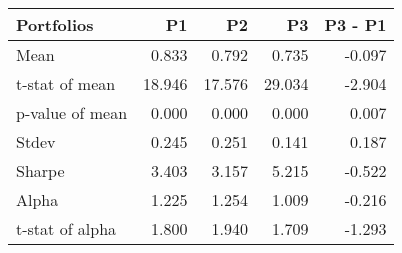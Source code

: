 \begin{tabular}{lrrrr}
\toprule
Portfolios & P1 & P2 & P3 & P3 - P1 \\
\midrule
Mean & 0.833 & 0.792 & 0.735 & -0.097 \\
t-stat of mean & 18.946 & 17.576 & 29.034 & -2.904 \\
p-value of mean & 0.000 & 0.000 & 0.000 & 0.007 \\
Stdev & 0.245 & 0.251 & 0.141 & 0.187 \\
Sharpe & 3.403 & 3.157 & 5.215 & -0.522 \\
Alpha & 1.225 & 1.254 & 1.009 & -0.216 \\
t-stat of alpha & 1.800 & 1.940 & 1.709 & -1.293 \\
\bottomrule
\end{tabular}
